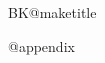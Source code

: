 \documentclass[parskip=half*,DIV=16,fontsize =10pt]{scrartcl}
\makeatletter
\newcommand{\solderingTutDocumentContent}{	
			
		\csname BK@maketitle\endcsname
		\par
		
		\Printsteps
		\par
		\csname @appendix\endcsname
		
	}
\makeatother
\begin{document}
	

	
\solderingTutDocumentContent
\end{document}
